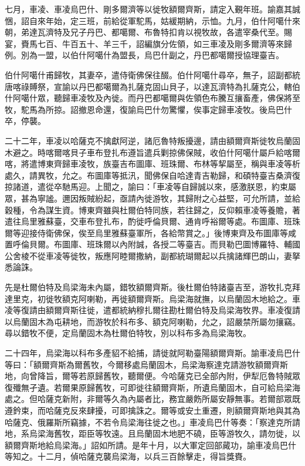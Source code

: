 \begin{pinyinscope}
七月，車凌、車凌烏巴什、剛多爾濟等以徙牧額爾齊斯，請定入覲年班。諭嘉其誠悃，詔自來年始，定三班，前給從軍駝馬，姑緩期納，示恤。九月，伯什阿噶什來朝，弟達瓦濟特及兄子丹巴、都噶爾、布魯特扣肯以視牧故，各遣宰桑代至。賜宴，賚馬七百、牛百五十、羊三千，詔編旗分佐領，如三車凌及剛多爾濟等來歸例。別為一盟，以伯什阿噶什為盟長，烏巴什副之，丹巴都噶爾授協理臺吉。

伯什阿噶什甫歸牧，其妻卒，遣侍衛佛保往醊。伯什阿噶什尋卒，無子，詔副都統唐喀祿賻祭，宣諭以丹巴都噶爾為扎薩克固山貝子，以達瓦濟特為扎薩克公，轄伯什阿噶什眾，聽歸車凌牧及內徙。而丹巴都噶爾與佐領色布騰互攘畜產，佛保將至牧，駝馬為所掠。詔撤恩命還，復諭烏巴什勿驚懼，俟事定歸車凌牧。後烏巴什卒，停襲。

二十二年，車凌以哈薩克不擒獻阿逆，諸厄魯特叛擾邊，請由額爾齊斯徙牧烏蘭固木避之。時喀爾喀貝子車布登扎布遵旨遣兵剿掠佛保賊，收伯什阿噶什屬戶給喀爾喀，將遣博東齊歸車凌牧，族臺吉布圖庫、班珠爾、布林等挈屬至，稱與車凌等析處久，請異牧，允之。布圖庫等抵汛，聞佛保自哈達青吉勒歸，和碩特臺吉桑濟復掠諸道，遣從卒馳馬迎。上聞之，諭曰：「車凌等自歸誠以來，感激朕恩，約束屬眾，甚為寧謐。邇因叛賊紛起，亟請內徙游牧，其歸附之心益堅，可允所請，並給穀種，令為謀生資。博東齊雖與杜爾伯特同族，若往歸之，反仰賴車凌等養贍，著遣往烏里雅蘇臺，交車布登扎布，酌徙呼倫貝爾、通肯呼裕爾等處。布圖庫、班珠爾等迎接侍衛佛保，俟至烏里雅蘇臺軍所，各給幣賞之。」後博東齊及布圖庫等咸置呼倫貝爾。布圖庫、班珠爾以內附誠，各授二等臺吉。而貝勒巴圖博羅特、輔國公舍棱不從車凌等徙牧，叛應阿睦爾撒納，副都統瑚爾起以兵擒諸輝巴朗山，妻拏悉論誅。

先是杜爾伯特及烏梁海未內屬，錯牧額爾齊斯。後杜爾伯特諸臺吉至，游牧扎克拜達里克，初徙牧額克阿喇勒，再徙額爾齊斯。烏梁海就撫，以烏蘭固木地給之。車凌等復請由額爾齊斯往徙，遣都統納穆扎爾往勘杜爾伯特及烏梁海牧界。車凌復請以烏蘭固木為屯耕地，而游牧於科布多、額克阿喇勒，允之，詔嚴禁所屬勿攘竊。尋以錯牧不便，定烏蘭固木為杜爾伯特牧，別以科布多為烏梁海牧。

二十四年，烏梁海以科布多產貂不給捕，請徙就阿勒臺陽額爾齊斯。諭車凌烏巴什等曰：「額爾齊斯為爾舊牧，今爾移處烏蘭固木，烏梁海察達克請游牧額爾齊斯地，向曾降旨，爾等若原歸舊牧，聽爾便。今哈薩克已全部內附，伊犁厄魯特賊眾復殲無孑遺。若爾果原歸舊牧，可即徙往額爾齊斯，所遺烏蘭固木，自可給烏梁海處之。但哈薩克新附，非爾等久為內屬者比，務宜嚴飭所屬安靜無事。若爾部眾既遵鈐束，而哈薩克反來肆擾，可即擒誅之。爾等或安土重遷，則額爾齊斯地與其為哈薩克、俄羅斯所竊據，不若令烏梁海往徙之也。」車凌烏巴什等奏：「察達克所請地，系烏梁海舊牧，距臣等牧遠。且烏蘭固木地肥不磽，臣等游牧久，請勿徙，以額爾齊斯地給烏梁海。」詔如所請。是年十月，以大軍定回部蕆功，諭車凌烏巴什等知之。十二月，偵哈薩克襲烏梁海，以兵三百餘擊走，得旨獎賚。


\end{pinyinscope}
